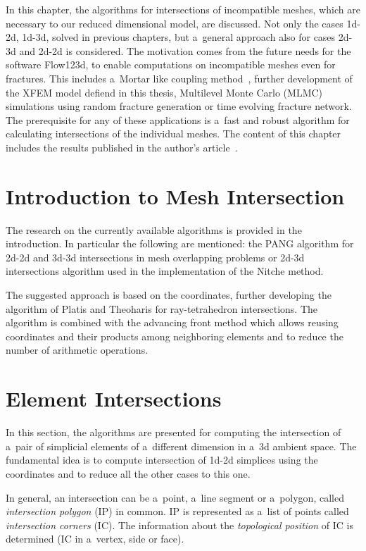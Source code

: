 
In this chapter, the algorithms for intersections of incompatible meshes, which are necessary to our reduced dimensional model, are discussed.
Not only the cases 1d-2d, 1d-3d, solved in previous chapters, but a~general approach also for cases 2d-3d and 2d-2d is considered.
The motivation comes from the future needs for the software Flow123d, to enable computations on incompatible meshes even for fractures.
This includes a~Mortar like coupling method~\cite{brezina_2012}, further development of the XFEM model defiend in this thesis,
Multilevel Monte Carlo (MLMC)~\cite{giles_mlmc_2015} simulations using random fracture generation or time evolving fracture network.
The prerequisite for any of these applications is a~fast and robust algorithm for calculating intersections of the individual meshes.
The content of this chapter includes the results published in the author's article~\cite{brezina_2017}.


\section{Introduction to Mesh Intersection}

The research on the currently available algorithms is provided in the introduction.
In particular the following are mentioned: the PANG algorithm \cite{gander_algorithm_2013} for 2d-2d and 3d-3d intersections in mesh overlapping problems or
2d-3d intersections algorithm \cite{massing_efficient_2013, gtslib} used in the implementation of the Nitche method.

The suggested approach is based on the \plucker coordinates, further developing the algorithm of Platis and Theoharis \cite{platis_fast_2003}
for ray-tetrahedron intersections. The algorithm is combined with the advancing front method which allows reusing \plucker coordinates
and their products among neighboring elements and to reduce the number of arithmetic operations. 

\section{Element Intersections}
\label{sec:element intersecitons}
In this section, the algorithms are presented for computing the intersection of a~pair of simplicial elements
of a~different dimension in a~3d ambient space. The fundamental idea is to compute intersection of 1d-2d 
simplices using the \plucker coordinates and to reduce all the other cases to this one. 

In general, an intersection can be a~point, a~line segment or a~polygon, called \emph{intersection polygon} (IP) in common.
IP is represented as a~list of points called \emph{intersection corners} (IC).
The information about the \emph{topological position} of IC is determined (IC in a~vertex, side or face).

